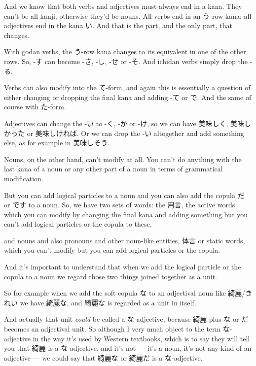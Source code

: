 And we know that both verbs and adjectives must always end in a kana. They can't be all kanji, otherwise they'd be nouns. All verbs end in an う-row kana; all adjectives end in the kana い. And that is the part, and the only part, that changes.

With godan verbs, the う-row kana changes to its equivalent in one of the other rows. So, -す can become -さ, -し, -せ or -そ. And ichidan verbs simply drop the -る.

Verbs can also modify into the て-form, and again this is essentially a question of either changing or dropping the final kana and adding -て or で. And the same of course with た-form.

Adjectives can change the -い to -く, -か or -け, so we can have 美味しく, 美味しかった or 美味しければ. Or we can drop the -い altogether and add something else, as for example in 美味しそう.

\thinrule

Nouns, on the other hand, can't modify at all. You can't do anything with the last kana of a noun or any other part of a noun in terms of grammatical modification.

But you can add logical particles to a noun and you can also add the copula だ or です to a noun. So, we have two sets of words: the 用言, the active words which you can modify by changing the final kana and adding something but you can't add logical particles or the copula to these,

\thinrule

and nouns and also pronouns and other noun-like entities, 体言 or static words, which you can't modify but you can add logical particles or the copula.

And it's important to understand that when we add the logical particle or the copula to a noun we regard those two things joined together as a unit.

\thinrule

So for example when we add the soft copula な to an adjectival noun like 綺麗/きれい we have 綺麗な, and 綺麗な is regarded as a unit in itself.

{}

And actually that unit {\em could} be called a な-adjective, because 綺麗 plus な or だ becomes an adjectival unit. So although I very much object to the term な-adjective in the way it's used by Western textbooks, which is to say they will tell you that 綺麗 is a な-adjective, and it's not --- it's a noun, it's not any kind of an adjective --- we could say that 綺麗な or 綺麗だ is a な-adjective.

